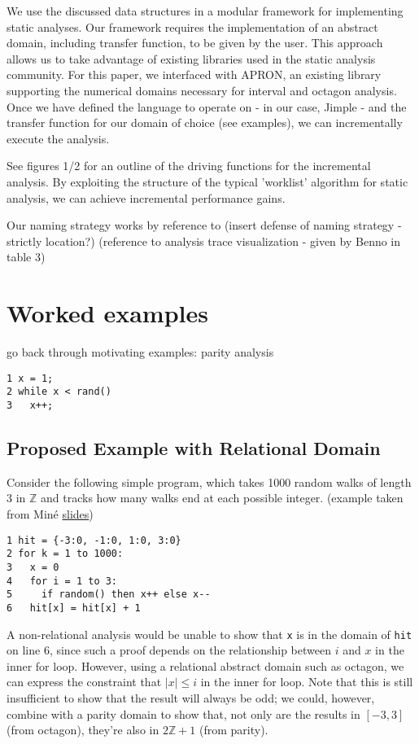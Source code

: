 \documentclass[acmlarge,anonymous]{acmart}\settopmatter{printfolios=true}
\begin{document}
We use the discussed data structures in a modular framework for implementing static analyses. Our framework requires the implementation of an abstract domain, including transfer function, to be given by the user. This approach allows us to take advantage of existing libraries used in the static analysis community. For this paper, we interfaced with APRON, an existing library supporting the numerical domains necessary for interval and octagon analysis. Once we have defined the language to operate on - in our case, Jimple - and the transfer function for our domain of choice (see examples), we can incrementally execute the analysis.

See figures 1/2 for an outline of the driving functions for the incremental analysis. By exploiting the structure of the typical 'worklist' algorithm for static analysis, we can achieve incremental performance gains. 

Our naming strategy works by reference to (insert defense of naming strategy - strictly location?) (reference to analysis trace visualization - given by Benno in table 3)

\section{Worked examples}

go back through motivating examples: parity analysis

\begin{lstlisting}
1 x = 1;
2 while x < rand()
3   x++;
\end{lstlisting}


\subsection{Proposed Example with Relational Domain}

Consider the following simple program, which takes 1000 random walks of length 3 in $\mathbb{Z}$ and tracks how many walks end at each possible integer. (example taken from Min\'e \href{https://pdfs.semanticscholar.org/ccb9/2bfe24199455d7c4a430f756c915cd4e5ae8.pdf}{slides})
\begin{lstlisting}
1 hit = {-3:0, -1:0, 1:0, 3:0}
2 for k = 1 to 1000:
3   x = 0
4   for i = 1 to 3:
5     if random() then x++ else x--
6   hit[x] = hit[x] + 1
\end{lstlisting}

A non-relational analysis would be unable to show that \texttt{x} is in the domain of \texttt{hit} on line 6, since such a proof depends on the relationship between $i$ and $x$ in the inner for loop.  However,  using a relational abstract domain such as octagon, we can express the constraint that $|x|\leq i$ in the inner for loop.  Note that this is still insufficient to show that the result will always be odd; we could, however, combine with a parity domain to show that, not only are the results in $[-3,3]$ (from octagon), they're also in $2\mathbb{Z}+1$ (from parity).
\end{document}

